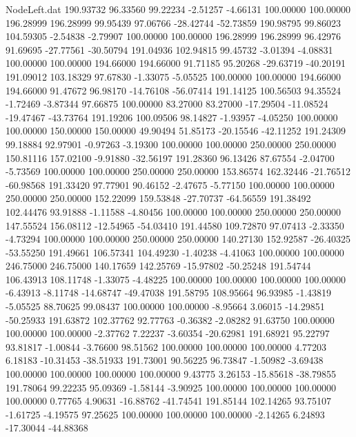\begin{filecontents}{NodeLeft.dat}
 190.93732   96.33560   99.22234    -2.51257   -4.66131  100.00000  100.00000  196.28999  196.28999   99.95439   97.06766  -28.42744  -52.73859
 190.98795   99.86023  104.59305    -2.54838   -2.79907  100.00000  100.00000  196.28999  196.28999   96.42976   91.69695  -27.77561  -30.50794
 191.04936  102.94815   99.45732    -3.01394   -4.08831  100.00000  100.00000  194.66000  194.66000   91.71185   95.20268  -29.63719  -40.20191
 191.09012  103.18329   97.67830    -1.33075   -5.05525  100.00000  100.00000  194.66000  194.66000   91.47672   96.98170  -14.76108  -56.07414
 191.14125  100.56503   94.35524    -1.72469   -3.87344   97.66875  100.00000   83.27000   83.27000  -17.29504  -11.08524  -19.47467  -43.73764
 191.19206  100.09506   98.14827    -1.93957   -4.05250  100.00000  100.00000  150.00000  150.00000   49.90494   51.85173  -20.15546  -42.11252
 191.24309   99.18884   92.97901    -0.97263   -3.19300  100.00000  100.00000  250.00000  250.00000  150.81116  157.02100   -9.91880  -32.56197
 191.28360   96.13426   87.67554    -2.04700   -5.73569  100.00000  100.00000  250.00000  250.00000  153.86574  162.32446  -21.76512  -60.98568
 191.33420   97.77901   90.46152    -2.47675   -5.77150  100.00000  100.00000  250.00000  250.00000  152.22099  159.53848  -27.70737  -64.56559
 191.38492  102.44476   93.91888    -1.11588   -4.80456  100.00000  100.00000  250.00000  250.00000  147.55524  156.08112  -12.54965  -54.03410
 191.44580  109.72870   97.07413    -2.33350   -4.73294  100.00000  100.00000  250.00000  250.00000  140.27130  152.92587  -26.40325  -53.55250
 191.49661  106.57341  104.49230    -1.40238   -4.41063  100.00000  100.00000  246.75000  246.75000  140.17659  142.25769  -15.97802  -50.25248
 191.54744  106.43913  108.11748    -1.33075   -4.48225  100.00000  100.00000  100.00000  100.00000   -6.43913   -8.11748  -14.68747  -49.47038
 191.58795  108.95664   96.93985    -1.43819   -5.05525   88.70625   99.08437  100.00000  100.00000   -8.95664    3.06015  -14.29851  -50.25933
 191.63872  102.37762   92.77763    -0.36382   -2.08282   91.63750  100.00000  100.00000  100.00000   -2.37762    7.22237   -3.60354  -20.62981
 191.68921   95.22797   93.81817    -1.00844   -3.76600   98.51562  100.00000  100.00000  100.00000    4.77203    6.18183  -10.31453  -38.51933
 191.73001   90.56225   96.73847    -1.50982   -3.69438  100.00000  100.00000  100.00000  100.00000    9.43775    3.26153  -15.85618  -38.79855
 191.78064   99.22235   95.09369    -1.58144   -3.90925  100.00000  100.00000  100.00000  100.00000    0.77765    4.90631  -16.88762  -41.74541
 191.85144  102.14265   93.75107    -1.61725   -4.19575   97.25625  100.00000  100.00000  100.00000   -2.14265    6.24893  -17.30044  -44.88368

\end{filecontents}
